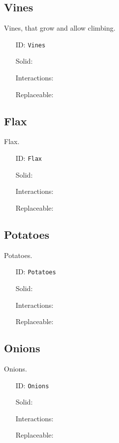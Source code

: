 \subsection{Vines}\label{subsec:blocks_vines}
Vines, that grow and allow climbing.
\newline
\begin{itemize}[nosep]
    \item[ID:] \texttt{Vines}
    \item[Solid:]  \XSolidBrush \item[Interactions:]  \XSolidBrush \item[Replaceable:]  \XSolidBrush
\end{itemize}

\subsection{Flax}\label{subsec:blocks_flax}
Flax.
\newline
\begin{itemize}[nosep]
    \item[ID:] \texttt{Flax}
    \item[Solid:]  \XSolidBrush \item[Interactions:]  \XSolidBrush \item[Replaceable:]  \XSolidBrush
\end{itemize}

\subsection{Potatoes}\label{subsec:blocks_potatoes}
Potatoes.
\newline
\begin{itemize}[nosep]
    \item[ID:] \texttt{Potatoes}
    \item[Solid:]  \XSolidBrush \item[Interactions:]  \XSolidBrush \item[Replaceable:]  \XSolidBrush
\end{itemize}

\subsection{Onions}\label{subsec:blocks_onions}
Onions.
\newline
\begin{itemize}[nosep]
    \item[ID:] \texttt{Onions}
    \item[Solid:]  \XSolidBrush \item[Interactions:]  \XSolidBrush \item[Replaceable:]  \XSolidBrush
\end{itemize}


